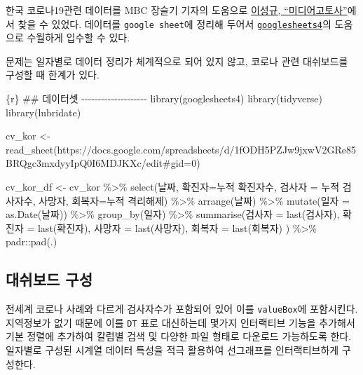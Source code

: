 \documentclass[
  letterpaper,
]{book}
\newenvironment{Shaded}{\begin{snugshade}}{\end{snugshade}}
\newcommand{\InformationTok}[1]{\textcolor[rgb]{0.37,0.37,0.37}{#1}}
\begin{document}
한국 코로나19관련 데이터를 MBC 장슬기 기자의 도움으로
\href{https://www.mediagotosa.com/korona19-hwagsan-ilbyeol-hyeonhwang-jeongri/}{이성규,
``미디어고토사''}에서 찾을 수 있었다. 데이터를 \texttt{google\ sheet}에
정리해 두어서
\href{https://github.com/tidyverse/googlesheets4}{\texttt{googlesheets4}}의
도움으로 수월하게 입수할 수 있다.

문제는 일자별로 데이터 정리가 체계적으로 되어 있지 않고, 코로나 관련
대쉬보드를 구성할 때 한계가 있다.

\begin{Shaded}
\begin{Highlighting}[]
\InformationTok{\textasciigrave{}\textasciigrave{}\textasciigrave{}\{r\}}
\InformationTok{\#\# 데이터셋 {-}{-}{-}{-}{-}{-}{-}{-}{-}{-}{-}{-}{-}{-}{-}{-}{-}{-}{-}{-}}
\InformationTok{library(googlesheets4)}
\InformationTok{library(tidyverse)}
\InformationTok{library(lubridate)}

\InformationTok{cv\_kor \textless{}{-} read\_sheet(\textquotesingle{}https://docs.google.com/spreadsheets/d/1fODH5PZJw9jxwV2GRe85BRQgc3mxdyyIpQ0I6MDJKXc/edit\#gid=0\textquotesingle{})}

\InformationTok{cv\_kor\_df \textless{}{-} cv\_kor \%\textgreater{}\% }
\InformationTok{  select(날짜, 확진자=\textasciigrave{}누적 확진자수\textasciigrave{}, 검사자 = \textasciigrave{}누적 검사자수\textasciigrave{}, 사망자, 회복자=\textasciigrave{}누적 격리해제\textasciigrave{}) \%\textgreater{}\% }
\InformationTok{  arrange(날짜) \%\textgreater{}\% }
\InformationTok{  mutate(일자 = as.Date(날짜)) \%\textgreater{}\% }
\InformationTok{  group\_by(일자) \%\textgreater{}\% }
\InformationTok{  summarise(검사자 = last(검사자),}
\InformationTok{               확진자 = last(확진자),}
\InformationTok{               사망자 = last(사망자),}
\InformationTok{               회복자 = last(회복자)}
\InformationTok{            )  \%\textgreater{}\% }
\InformationTok{  padr::pad(.)}
\InformationTok{\textasciigrave{}\textasciigrave{}\textasciigrave{}}
\end{Highlighting}
\end{Shaded}

\hypertarget{corona-korea-dashboard}{%
\subsection{대쉬보드 구성}\label{corona-korea-dashboard}}

전세계 코로나 사례와 다르게 검사자수가 포함되어 있어 이를
\texttt{valueBox}에 포함시킨다. 지역정보가 없기 때문에 이를 \texttt{DT}
표로 대신하는데 몇가지 인터랙티브 기능을 추가해서 기본 정렬에 추가하여
칼럼별 검색 및 다양한 파일 형태로 다운로드 가능하도록 한다. 일자별로
구성된 시계열 데이터 특성을 적극 활용하여 선그래프를 인터랙티브하게
구성한다.
\end{document}
